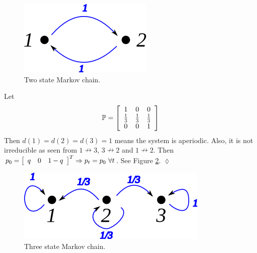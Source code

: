 \begin{figure}[ht!]
	\centering
	\includegraphics[width=.4\textwidth]{images/10mc2}
	\caption{Two state Markov chain.}
	\label{fig:10mc2}
\end{figure}

\begin{example}
Let
$$\mathbb{P} = \left[\begin{array}{c c c} 1 & 0 & 0 \\ \frac{1}{3} & \frac{1}{3} & \frac{1}{3} \\ 0 & 0 & 1 \end{array}\right]$$
Then $d(1)=d(2)=d(3)=1$ means the system is aperiodic. Also, it is not irreducible as seen from $1\nrightarrow 3$, $3\nrightarrow 2$ and $1\nrightarrow 2$. Then $p_0=\left[\begin{array}{c c c} q & 0 & 1-q \end{array}\right]^T \Rightarrow p_t=p_0 ~\forall t$. See Figure \ref{fig:10mc3a}.
$\lozenge$
\end{example}

\begin{figure}[ht!]
	\centering
	\includegraphics[width=.4\textwidth]{images/10mc3a}
	\caption{Three state Markov chain.}
	\label{fig:10mc3a}
\end{figure}

